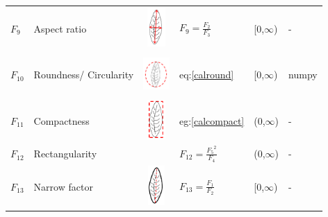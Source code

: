 \documentclass{article}
\begin{document}
\begin{longtable}{p{1cm}lllll}
$F_{9}$                     & Aspect ratio                                                                                &     \centering\includegraphics[width=10mm, height=15mm]{Figures/AR.png}                       &       $F_9 = \frac{F_2}{F_3}$                      &       [0,$\infty$)                    &                                -                               \\
$F_{10}$                     & Roundness/ Circularity                                                                      &       \centering\includegraphics[width=10mm, height=15mm]{Figures/roudness.png}                       &           eq:\ref{calround}                  &          [0,$\infty$)                &     numpy                                                          \\
$F_{11}$                     & Compactness                                                                                 &     \centering\includegraphics[width=10mm, height=15mm]{Figures/rect.png}                       &        eg:\ref{calcompact}                     &     (0,$\infty$)                      &                   -                                            \\
$F_{12}$                     & Rectangularity                                                                              &                            &       $F_{12} = \frac{{F_5}^2}{F_4}$                      &      (0,$\infty$)                     &               -                                                \\
$F_{13}$                     & Narrow factor                                                                               &       \centering\includegraphics[width=10mm, height=15mm]{Figures/nf.png}                     &         $F_{13} = \frac{F_1}{F_2}$                    &     [0,$\infty$)                      &                     -                                          \\

\end{longtable}
\end{document}
